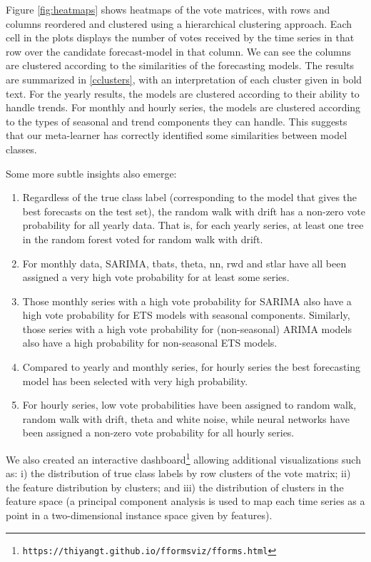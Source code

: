 \documentclass[11pt,a4paper,]{article}
\providecommand{\tightlist}{%
  \setlength{\itemsep}{0pt}\setlength{\parskip}{0pt}}
\begin{document}
Figure \ref{fig:heatmaps} shows heatmaps \autocite{iheatmapr} of the vote matrices, with rows and columns reordered and clustered using a hierarchical clustering approach. Each cell in the plots displays the number of votes received by the time series in that row over the candidate forecast-model in that column. We can see the columns are clustered according to the similarities of the forecasting models. The results are summarized in \autoref{cclusters}, with an interpretation of each cluster given in bold text. For the yearly results, the models are clustered according to their ability to handle trends. For monthly and hourly series, the models are clustered according to the types of seasonal and trend components they can handle. This suggests that our meta-learner has correctly identified some similarities between model classes.

Some more subtle insights also emerge:

\begin{enumerate}
\def\labelenumi{\arabic{enumi}.}
\tightlist
\item
  Regardless of the true class label (corresponding to the model that gives the best forecasts on the test set), the random walk with drift has a non-zero vote probability for all yearly data. That is, for each yearly series, at least one tree in the random forest voted for random walk with drift.
\item
  For monthly data, SARIMA, tbats, theta, nn, rwd and stlar have all been assigned a very high vote probability for at least some series.
\item
  Those monthly series with a high vote probability for SARIMA also have a high vote probability for ETS models with seasonal components. Similarly, those series with a high vote probability for (non-seasonal) ARIMA models also have a high probability for non-seasonal ETS models.
\item
  Compared to yearly and monthly series, for hourly series the best forecasting model has been selected with very high probability.
\item
  For hourly series, low vote probabilities have been assigned to random walk, random walk with drift, theta and white noise, while neural networks have been assigned a non-zero vote probability for all hourly series.
\end{enumerate}

We also created an interactive dashboard\footnote{\texttt{https://thiyangt.github.io/fformsviz/fforms.html}} allowing additional visualizations such as: i) the distribution of true class labels by row clusters of the vote matrix; ii) the feature distribution by clusters; and iii) the distribution of clusters in the feature space (a principal component analysis is used to map each time series as a point in a two-dimensional instance space given by features).
\end{document}
